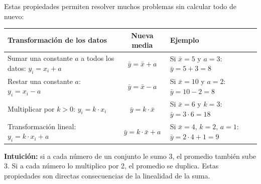 \documentclass[11pt, letterpaper]{article}
\begin{document}
\begin{tcolorbox}[importantbox, title={Propiedades de transformación de la media}]
Estas propiedades permiten resolver muchos problemas sin calcular todo de nuevo:

\medskip
\begin{center}
\renewcommand{\arraystretch}{1.5}
\begin{tabular}{p{4.5cm} c p{4.5cm}}
\toprule
\textbf{Transformación de los datos} & \textbf{Nueva media} & \textbf{Ejemplo}\\
\midrule
Sumar una constante $a$ a todos los datos: \newline $y_i = x_i + a$ &
$\bar{y} = \bar{x} + a$ &
Si $\bar{x}=5$ y $a=3$: \newline $\bar{y} = 5+3=8$\\
Restar una constante $a$: \newline $y_i = x_i - a$ &
$\bar{y} = \bar{x} - a$ &
Si $\bar{x}=10$ y $a=2$: \newline $\bar{y} = 10-2=8$\\
Multiplicar por $k > 0$: \newline $y_i = k \cdot x_i$ &
$\bar{y} = k \cdot \bar{x}$ &
Si $\bar{x}=6$ y $k=3$: \newline $\bar{y} = 3 \cdot 6=18$\\
Transformación lineal: \newline $y_i = k \cdot x_i + a$ &
$\bar{y} = k \cdot \bar{x} + a$ &
Si $\bar{x}=4$, $k=2$, $a=1$: \newline $\bar{y} = 2\cdot4+1=9$\\
\bottomrule
\end{tabular}
\end{center}

\medskip
\textbf{Intuición:} si a cada número de un conjunto le sumo 3, el promedio también sube 3. Si a cada número lo multiplico por 2, el promedio se duplica. Estas propiedades son directas consecuencias de la linealidad de la suma.
\end{tcolorbox}
\end{document}
